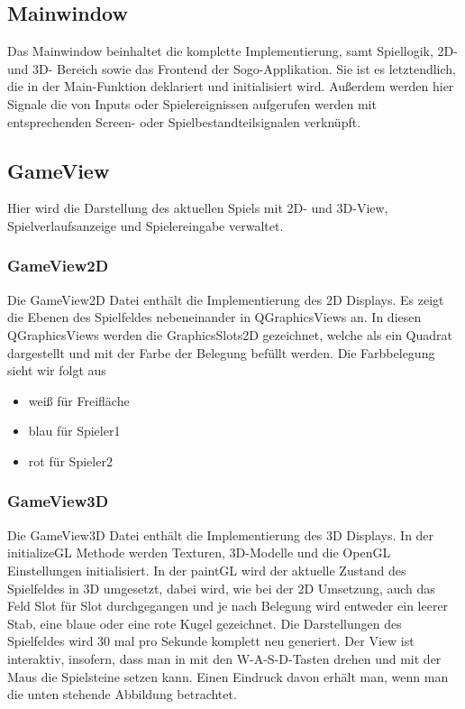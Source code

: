 \documentclass[a4paper]{scrartcl}
\begin{document}
\subsection{Mainwindow}\label{ch:Mainwindow}
Das Mainwindow beinhaltet die komplette Implementierung, samt Spiellogik, 2D- und 3D- Bereich sowie das Frontend der Sogo-Applikation. Sie ist es letztendlich, die in der Main-Funktion deklariert und initialisiert wird. Außerdem werden hier Signale die von Inputs oder Spielereignissen aufgerufen werden mit entsprechenden Screen- oder Spielbestandteilsignalen verknüpft.

\subsection{GameView}\label{ch:GameView}
Hier wird die Darstellung des aktuellen Spiels mit 2D- und 3D-View, Spielverlaufsanzeige und Spielereingabe verwaltet.

\subsubsection{GameView2D}\label{ch:GameView2D}
Die GameView2D Datei enthält die Implementierung des 2D Displays. Es zeigt die Ebenen des Spielfeldes nebeneinander in QGraphicsViews an. In diesen QGraphicsViews werden die GraphicsSlots2D gezeichnet, welche als ein Quadrat dargestellt und mit der Farbe der Belegung befüllt werden. Die Farbbelegung sieht wir folgt aus
\begin{itemize}
	\item weiß für Freifläche
	\item blau für Spieler1
	\item rot für Spieler2
\end{itemize}

\subsubsection{GameView3D}\label{ch:GameView3D}
Die GameView3D Datei enthält die Implementierung des 3D Displays. In der initializeGL Methode werden Texturen, 3D-Modelle und die OpenGL Einstellungen initialisiert. In der paintGL wird der aktuelle Zustand des Spielfeldes
in 3D umgesetzt, dabei wird, wie bei der 2D Umsetzung, auch das Feld Slot für Slot durchgegangen und je nach Belegung wird entweder ein leerer Stab, eine blaue oder eine rote Kugel gezeichnet. Die Darstellungen des Spielfeldes wird 30 mal pro Sekunde komplett neu generiert. Der View ist interaktiv, insofern, dass man in mit den W-A-S-D-Tasten drehen und mit der Maus die Spielsteine setzen kann. Einen Eindruck davon erhält man, wenn man die unten stehende Abbildung betrachtet.
\end{document}
